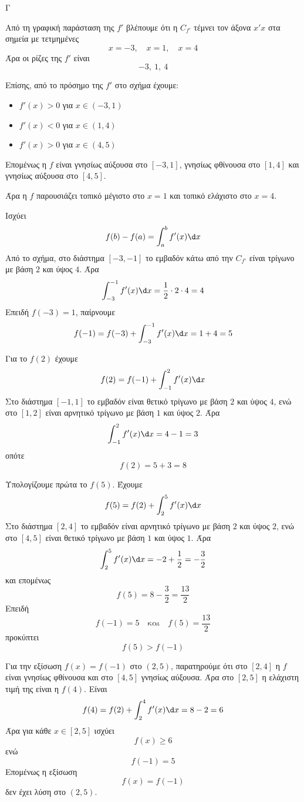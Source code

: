 \begin{thema}{Γ}
\begin{erwthma}
\item Από τη γραφική παράσταση της $f'$ βλέπουμε ότι η $C_{f'}$ τέμνει τον άξονα $x'x$ στα σημεία με τετμημένες
\[
x=-3,\quad x=1,\quad x=4
\]
Άρα οι ρίζες της $f'$ είναι
\[
-3,\ 1,\ 4
\]

Επίσης, από το πρόσημο της $f'$ στο σχήμα έχουμε:
\begin{itemize}
\item $f'(x)>0$ για $x\in(-3,1)$
\item $f'(x)<0$ για $x\in(1,4)$
\item $f'(x)>0$ για $x\in(4,5)$
\end{itemize}
Επομένως η $f$ είναι γνησίως αύξουσα στο $[-3,1]$, γνησίως φθίνουσα στο $[1,4]$ και γνησίως αύξουσα στο $[4,5]$.

Άρα η $f$ παρουσιάζει τοπικό μέγιστο στο $x=1$ και τοπικό ελάχιστο στο $x=4$.

\item Ισχύει
\[
f(b)-f(a)=\dint_a^b f'(x)\d x
\]
Από το σχήμα, στο διάστημα $[-3,-1]$ το εμβαδόν κάτω από την $C_{f'}$ είναι τρίγωνο με βάση $2$ και ύψος $4$.
Άρα
\[
\dint_{-3}^{-1} f'(x)\d x=\frac{1}{2}\cdot 2\cdot 4=4
\]
Επειδή $f(-3)=1$, παίρνουμε
\[
f(-1)=f(-3)+\dint_{-3}^{-1}f'(x)\d x=1+4=5
\]

Για το $f(2)$ έχουμε
\[
f(2)=f(-1)+\dint_{-1}^{2}f'(x)\d x
\]
Στο διάστημα $[-1,1]$ το εμβαδόν είναι θετικό τρίγωνο με βάση $2$ και ύψος $4$, ενώ στο $[1,2]$ είναι αρνητικό τρίγωνο με βάση $1$ και ύψος $2$.
Άρα
\[
\dint_{-1}^{2}f'(x)\d x=4-1=3
\]
οπότε
\[
f(2)=5+3=8
\]

\item Υπολογίζουμε πρώτα το $f(5)$.
Έχουμε
\[
f(5)=f(2)+\dint_2^5 f'(x)\d x
\]
Στο διάστημα $[2,4]$ το εμβαδόν είναι αρνητικό τρίγωνο με βάση $2$ και ύψος $2$, ενώ στο $[4,5]$ είναι θετικό τρίγωνο με βάση $1$ και ύψος $1$.
Άρα
\[
\dint_2^5 f'(x)\d x=-2+\frac{1}{2}=-\frac{3}{2}
\]
και επομένως
\[
f(5)=8-\frac{3}{2}=\frac{13}{2}
\]
Επειδή
\[
f(-1)=5
\quad \text{και}\quad
f(5)=\frac{13}{2}
\]
προκύπτει
\[
f(5)>f(-1)
\]

Για την εξίσωση $f(x)=f(-1)$ στο $(2,5)$, παρατηρούμε ότι στο $[2,4]$ η $f$ είναι γνησίως φθίνουσα και στο $[4,5]$ γνησίως αύξουσα.
Άρα στο $[2,5]$ η ελάχιστη τιμή της είναι η $f(4)$.
Είναι
\[
f(4)=f(2)+\dint_2^4 f'(x)\d x=8-2=6
\]
Άρα για κάθε $x\in[2,5]$ ισχύει
\[
f(x)\geq 6
\]
ενώ
\[
f(-1)=5
\]
Επομένως η εξίσωση
\[
f(x)=f(-1)
\]
δεν έχει λύση στο $(2,5)$.


\end{erwthma}
\end{thema}
